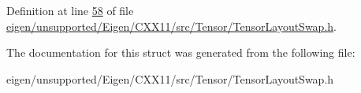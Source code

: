 Definition at line \hyperlink{eigen_2unsupported_2_eigen_2_c_x_x11_2src_2_tensor_2_tensor_layout_swap_8h_source_l00058}{58} of file \hyperlink{eigen_2unsupported_2_eigen_2_c_x_x11_2src_2_tensor_2_tensor_layout_swap_8h_source}{eigen/unsupported/\+Eigen/\+C\+X\+X11/src/\+Tensor/\+Tensor\+Layout\+Swap.\+h}.



The documentation for this struct was generated from the following file\+:\begin{DoxyCompactItemize}
\item 
eigen/unsupported/\+Eigen/\+C\+X\+X11/src/\+Tensor/\+Tensor\+Layout\+Swap.\+h\end{DoxyCompactItemize}
